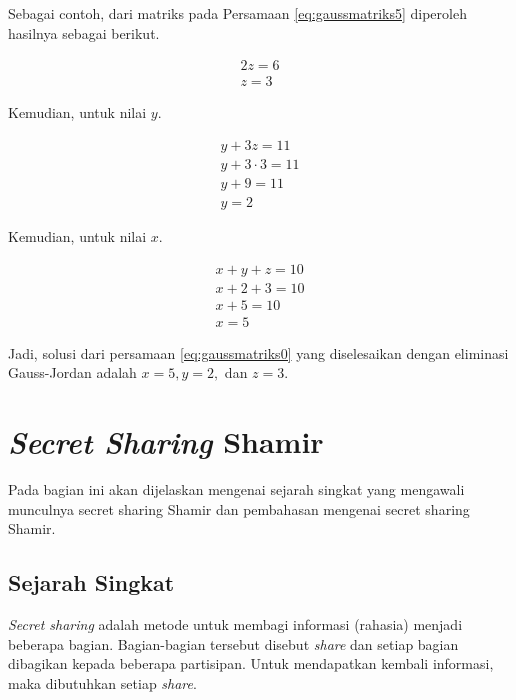 Sebagai contoh, dari matriks pada Persamaan \ref{eq:gaussmatriks5} diperoleh hasilnya sebagai berikut.

\begin{gather}
	2z = 6 \nonumber \\
	z = 3 \label{eq:gaussmatriks6}
\end{gather}

Kemudian, untuk nilai \begin{math}y\end{math}.

\begin{gather}
	y + 3z = 11 \nonumber \\
	y + 3\cdot3 = 11 \nonumber \\
	y + 9 = 11 \nonumber \\
	y = 2 \label{eq:gaussmatriks7}
\end{gather}

Kemudian, untuk nilai \begin{math}x\end{math}.

\begin{gather}
	x + y + z = 10 \nonumber \\
	x + 2 + 3 = 10 \nonumber \\
	x + 5 = 10 \nonumber \\
	x = 5 \label{eq:gaussmatriks8}
\end{gather}

Jadi, solusi dari persamaan \ref{eq:gaussmatriks0} yang diselesaikan dengan eliminasi Gauss-Jordan adalah \begin{math}x=5, y=2,\end{math} dan \begin{math}z=3\end{math}.

\section{\textit{Secret Sharing} Shamir}\label{sec:secretsharingshamir}

Pada bagian ini akan dijelaskan mengenai sejarah singkat yang mengawali munculnya secret sharing Shamir dan pembahasan mengenai secret sharing Shamir.

\subsection{Sejarah Singkat}

\textit{Secret sharing} adalah metode untuk membagi informasi (rahasia) menjadi beberapa bagian. Bagian-bagian tersebut disebut \textit{share} dan setiap bagian dibagikan kepada beberapa partisipan. Untuk mendapatkan kembali informasi, maka dibutuhkan setiap \textit{share}.

